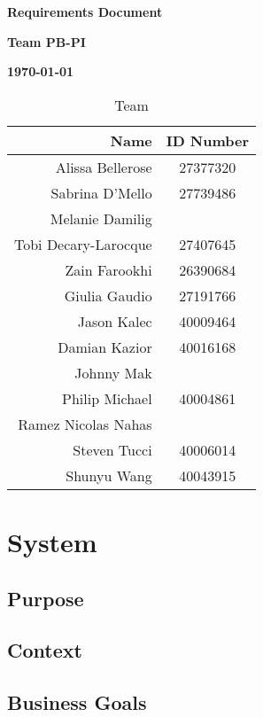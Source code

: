 \documentclass[12pt]{article}
\begin{document}
\vspace*{0.5in}
\centerline{\bf\Large Requirements Document}

\vspace*{0.5in}
\centerline{\bf\Large Team PB-PI}

\vspace*{0.5in}
\centerline{\bf\Large \today}

\vspace*{1.5in}
\begin{table}[htbp]
\caption{Team}
\begin{center}
\begin{tabular}{|r | c|}
\hline
Name & ID Number \\
\hline\hline
Alissa Bellerose & 27377320 \\
Sabrina D'Mello & 27739486 \\
Melanie Damilig & \\
Tobi Decary-Larocque & 27407645 \\
Zain Farookhi & 26390684 \\
Giulia Gaudio & 27191766 \\
Jason Kalec & 40009464 \\
Damian Kazior & 40016168 \\
Johnny Mak & \\
Philip Michael & 40004861 \\
Ramez Nicolas Nahas & \\
Steven Tucci & 40006014 \\
Shunyu Wang & 40043915 \\
\hline
\end{tabular}
\end{center}
\end{table}

\clearpage

\section{System}

\subsection{Purpose}

\subsection{Context}

\subsection{Business Goals}
\end{document}
